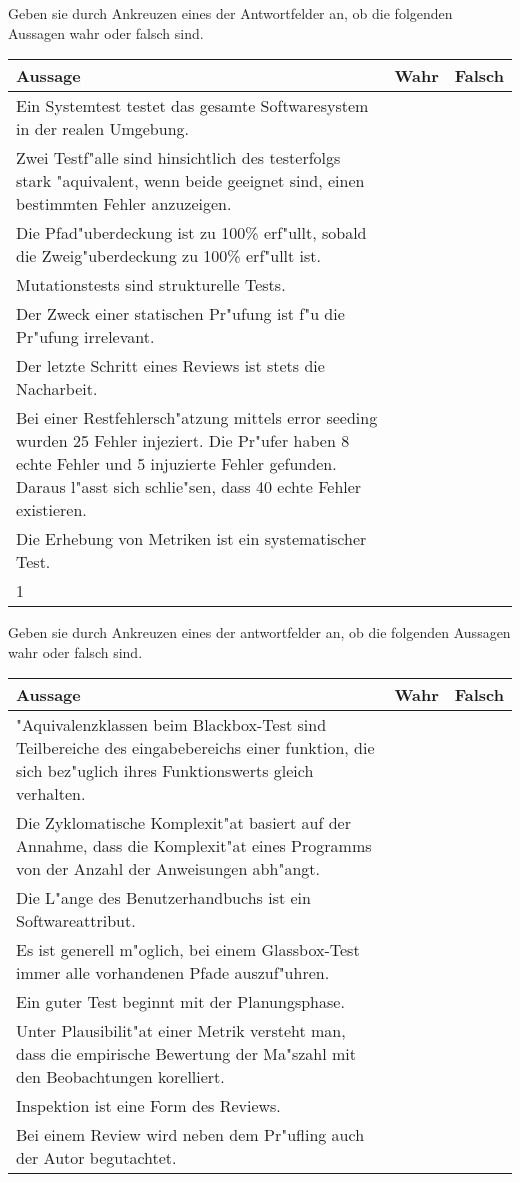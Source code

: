 \documentclass[12pt]{exam}
\begin{document}
\begin{questions}
\question[8] Geben sie durch Ankreuzen eines der Antwortfelder an, ob die folgenden Aussagen wahr oder falsch sind. \\
\addpoints
\begin{tabular}{| p{12cm} | c | c |} \hline
    Aussage & Wahr & Falsch \\ \hline
    Ein Systemtest testet das gesamte Softwaresystem in der realen Umgebung. & & \\ \hline
    Zwei Testf"alle sind hinsichtlich des testerfolgs stark "aquivalent, wenn beide geeignet sind, einen bestimmten Fehler anzuzeigen. & & \\ \hline
    Die Pfad"uberdeckung ist zu 100\% erf"ullt, sobald die Zweig"uberdeckung zu 100\% erf"ullt ist. & & \\ \hline
    Mutationstests sind strukturelle Tests. & & \\ \hline
    Der Zweck einer statischen Pr"ufung ist f"u die Pr"ufung irrelevant. & & \\ \hline
    Der letzte Schritt eines Reviews ist stets die Nacharbeit. & & \\ \hline
    Bei einer Restfehlersch"atzung mittels error seeding wurden 25 Fehler injeziert. Die Pr"ufer haben 8 echte Fehler und 5 injuzierte Fehler gefunden. Daraus l"asst sich schlie"sen, dass 40 echte Fehler existieren. & & \\ \hline
    Die Erhebung von Metriken ist ein systematischer Test. & & \\ \hline1
\end{tabular}

\question[8] Geben sie durch Ankreuzen eines der antwortfelder an, ob die folgenden Aussagen wahr oder falsch sind. \\
\addpoints
\begin{tabular}{| p{12cm} | c | c |} \hline
    Aussage & Wahr & Falsch \\ \hline
    "Aquivalenzklassen beim Blackbox-Test sind Teilbereiche des eingabebereichs einer funktion, die sich bez"uglich ihres Funktionswerts gleich verhalten. & & \\ \hline
    Die Zyklomatische Komplexit"at basiert auf der Annahme, dass die Komplexit"at eines Programms von der Anzahl der Anweisungen abh"angt. & & \\ \hline
    Die L"ange des Benutzerhandbuchs ist ein Softwareattribut. & & \\ \hline
    Es ist generell m"oglich, bei einem Glassbox-Test immer alle vorhandenen Pfade auszuf"uhren. & & \\ \hline
    Ein guter Test beginnt mit der Planungsphase. & & \\ \hline
    Unter Plausibilit"at einer Metrik versteht man, dass die empirische Bewertung der Ma"szahl mit den Beobachtungen korelliert. & & \\ \hline
    Inspektion ist eine Form des Reviews. & & \\ \hline
    Bei einem Review wird neben dem Pr"ufling auch der Autor begutachtet. & & \\ \hline
\end{tabular}


\end{questions}
\end{document}
